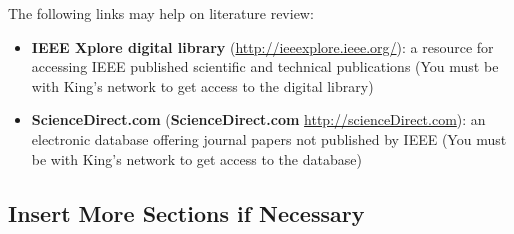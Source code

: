 The following links may help on literature review:
\begin{itemize}
	\item \textbf{IEEE Xplore digital library} (\hyperref[http://ieeexplore.ieee.org]{http://ieeexplore.ieee.org/}): a resource for accessing IEEE published scientific and technical publications (You must be with King's network to get access to the digital library)
	\item \textbf{ScienceDirect.com} (\textbf{ScienceDirect.com} \hyperref[http://scienceDirect.com]{http://scienceDirect.com}): an electronic database offering journal papers not published by IEEE (You must be with King's network to get access to the database)
\end{itemize}

\subsection{Insert More Sections if Necessary}